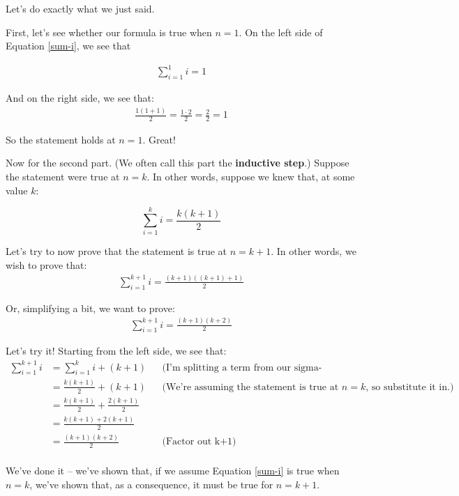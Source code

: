 Let's do exactly what we just said.

First, let's see whether our formula is true when $n=1$. On the left side of Equation \ref{sum-i}, we see that 

\begin{align*}
\sum_{i=1}^{1} i = 1
\end{align*}

And on the right side, we see that:
\begin{align*}
\frac{1(1+1)}{2} = \frac{1 \cdot 2}{2} = \frac{2}{2} = 1
\end{align*}

So the statement holds at $n = 1$. Great!

Now for the second part. (We often call this part the \textbf{inductive step}.) Suppose the statement were true at $n = k$. In other words, suppose we knew that, at some value $k$:

\begin{equation*}
\sum_{i=1}^k i = \frac{k(k+1)}{2}
\end{equation*}

Let's try to now prove that the statement is true at $n = k + 1$. In other words, we wish to prove that:
\begin{align*}
\sum_{i=1}^{k+1} i = \frac{(k+1)((k+1)+1)}{2}
\end{align*}

Or, simplifying a bit, we want to prove:
\begin{align*}
\sum_{i=1}^{k+1} i = \frac{(k+1)(k+2)}{2}
\end{align*}

Let's try it! Starting from the left side, we see that:
\begin{align*}
\sum_{i=1}^{k+1} i &= \sum_{i=1}^{k} i + (k+1) && \text{(I'm splitting a term from our sigma-expression. See why it works?)} \\
&= \frac{k(k+1)}{2} + (k+1) && \text{(We're assuming the statement is true at $n=k$, so substitute it in.)} \\
&= \frac{k(k+1)}{2} + \frac{2(k+1)}{2} \\
&= \frac{k(k+1) + 2(k+1)}{2} \\
&= \frac{(k+1)(k+2)}{2} && \text{(Factor out k+1)}\\
\end{align*}

We've done it -- we've shown that, if we assume Equation \ref{sum-i} is true when $n=k$, we've shown that, as a consequence, it must be true for $n = k+1$. 

